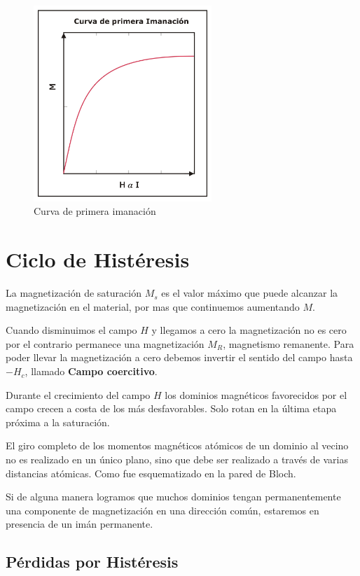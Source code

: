 \begin{figure}[H]
    \centering
    \includegraphics[width=0.6\textwidth]{./Figures/primeraImanacion}
	\caption{Curva de primera imanación}
	\label{fig:primeraImanacion}
\end{figure}


\section{Ciclo de Histéresis}

La magnetización de saturación $M_{s}$ es el valor máximo que puede alcanzar la magnetización en el material, por mas que continuemos aumentando $M$.

Cuando disminuimos el campo $H$ y llegamos a cero la magnetización no es cero por el contrario permanece una magnetización $M_{R}$, magnetismo remanente. Para poder llevar la magnetización a cero debemos invertir el sentido del campo hasta $-H_{c}$, llamado \textbf{Campo coercitivo}.

Durante el crecimiento del campo $H$ los dominios magnéticos favorecidos por el campo crecen a costa de los más desfavorables. Solo rotan en la última etapa próxima a la saturación. 

El giro completo de los momentos magnéticos atómicos de un dominio al vecino no es realizado en un
único plano, sino que debe ser realizado a través de varias distancias atómicas. Como fue esquematizado en la pared de Bloch. 

Si de alguna manera logramos que muchos dominios tengan permanentemente una componente de magnetización en una dirección común, estaremos en presencia de un imán permanente.

\subsection{Pérdidas por Histéresis}

